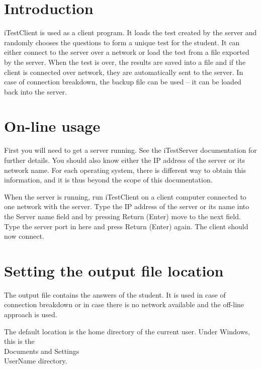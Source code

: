 \section{Introduction}

iTestClient is used as a client program.
It loads the test created by the server and randomly chooses the questions to form a unique test for the student.
It can either connect to the server over a network or load the test from a file exported by the server.
When the test is over, the results are saved into a file and if the client is connected over network, they are automatically sent to the server.
In case of connection breakdown, the backup file can be used -- it can be loaded back into the server.

\section{On-line usage}

First you will need to get a server running.
See the iTestServer documentation for further details.
You should also know either the IP address of the server or its network name.
For each operating system, there is different way to obtain this information, and it is thus beyond the scope of this documentation.

When the server is running, run iTestClient on a client computer connected to one network with the server.
Type the IP address of the server or its name into the Server name field and by pressing Return (Enter) move to the next field.
Type the server port in here and press Return (Enter) again.
The client should now connect.


\section{Setting the output file location}

The output file contains the answers of the student.
It is used in case of connection breakdown or in case there is no network available and the off-line approach is used.


The default location is the home directory of the current user.
Under Windows, this is the \\Documents and Settings\\UserName directory.

